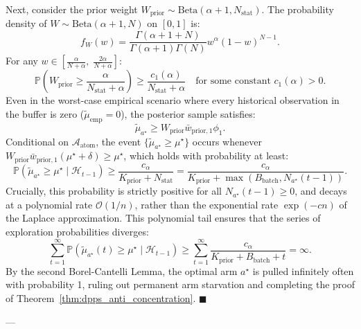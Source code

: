 \documentclass[twoside]{article}
\begin{document}
Next, consider the prior weight $W_{\text{prior}} \sim \text{Beta}(\alpha + 1, N_{\text{stat}})$. The probability density of $W \sim \text{Beta}(\alpha + 1, N)$ on $[0, 1]$ is:
\begin{equation}
f_W(w) = \frac{\Gamma(\alpha + 1 + N)}{\Gamma(\alpha + 1)\Gamma(N)} w^\alpha (1 - w)^{N - 1}.
\end{equation}
For any $w \in \left[ \frac{\alpha}{N + \alpha}, \; \frac{2\alpha}{N + \alpha} \right]$:
\begin{equation}
\mathbb{P}\left( W_{\text{prior}} \ge \frac{\alpha}{N_{\text{stat}} + \alpha} \right) \ge \frac{c_1(\alpha)}{N_{\text{stat}} + \alpha} \quad \text{for some constant } c_1(\alpha) > 0.
\end{equation}
Even in the worst-case empirical scenario where every historical observation in the buffer is zero ($\tilde{\mu}_{\text{emp}} = 0$), the posterior sample satisfies:
\begin{equation}
\tilde{\mu}_{a^\star} \ge W_{\text{prior}} \bar{w}_{\text{prior}, 1} \phi_1.
\end{equation}
Conditional on $\mathcal{A}_{\text{atom}}$, the event $\{\tilde{\mu}_{a^\star} \ge \mu^\star\}$ occurs whenever $W_{\text{prior}} \bar{w}_{\text{prior}, 1} (\mu^\star + \delta) \ge \mu^\star$, which holds with probability at least:
\begin{equation}
\mathbb{P}\left( \tilde{\mu}_{a^\star} \ge \mu^\star \mid \mathcal{H}_{t-1} \right) \ge \frac{c_\alpha}{K_{\text{prior}} + N_{\text{stat}}} = \frac{c_\alpha}{K_{\text{prior}} + \max(B_{\text{batch}}, N_{a^\star}(t-1))}.
\end{equation}
Crucially, this probability is strictly positive for all $N_{a^\star}(t-1) \ge 0$, and decays at a polynomial rate $\mathcal{O}(1/n)$, rather than the exponential rate $\exp(-c n)$ of the Laplace approximation. This polynomial tail ensures that the series of exploration probabilities diverges:
\begin{equation}
\sum_{t=1}^\infty \mathbb{P}\left( \tilde{\mu}_{a^\star}(t) \ge \mu^\star \mid \mathcal{H}_{t-1} \right) \ge \sum_{t=1}^\infty \frac{c_\alpha}{K_{\text{prior}} + B_{\text{batch}} + t} = \infty.
\end{equation}
By the second Borel-Cantelli Lemma, the optimal arm $a^\star$ is pulled infinitely often with probability 1, ruling out permanent arm starvation and completing the proof of Theorem~\ref{thm:dpps_anti_concentration}. \hfill $\blacksquare$

---
\end{document}
